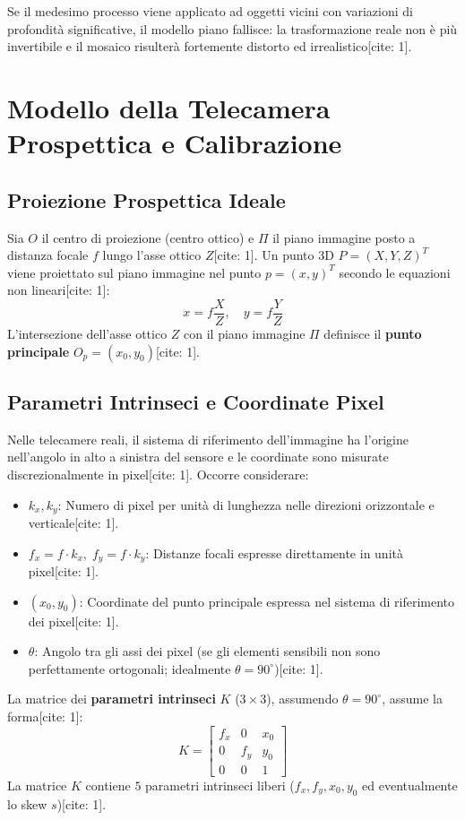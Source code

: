 Se il medesimo processo viene applicato ad oggetti vicini con variazioni di profondità significative, il modello piano fallisce: la trasformazione reale non è più invertibile e il mosaico risulterà fortemente distorto ed irrealistico[cite: 1].

\section{Modello della Telecamera Prospettica e Calibrazione}

\subsection{Proiezione Prospettica Ideale}
Sia $O$ il centro di proiezione (centro ottico) e $\Pi$ il piano immagine posto a distanza focale $f$ lungo l'asse ottico $Z$[cite: 1]. Un punto 3D $P = (X, Y, Z)^T$ viene proiettato sul piano immagine nel punto $p = (x, y)^T$ secondo le equazioni non lineari[cite: 1]:
\begin{equation}
x = f \frac{X}{Z}, \quad y = f \frac{Y}{Z}
\end{equation}
L'intersezione dell'asse ottico $Z$ con il piano immagine $\Pi$ definisce il \textbf{punto principale} $O_p = (x_0, y_0)$[cite: 1].

\subsection{Parametri Intrinseci e Coordinate Pixel}
Nelle telecamere reali, il sistema di riferimento dell'immagine ha l'origine nell'angolo in alto a sinistra del sensore e le coordinate sono misurate discrezionalmente in pixel[cite: 1]. Occorre considerare:
\begin{itemize}
    \item $k_x, k_y$: Numero di pixel per unità di lunghezza nelle direzioni orizzontale e verticale[cite: 1].
    \item $f_x = f \cdot k_x, \; f_y = f \cdot k_y$: Distanze focali espresse direttamente in unità pixel[cite: 1].
    \item $(x_0, y_0)$: Coordinate del punto principale espressa nel sistema di riferimento dei pixel[cite: 1].
    \item $\theta$: Angolo tra gli assi dei pixel (se gli elementi sensibili non sono perfettamente ortogonali; idealmente $\theta = 90^\circ$)[cite: 1].
\end{itemize}

La matrice dei \textbf{parametri intrinseci} $K$ ($3 \times 3$), assumendo $\theta = 90^\circ$, assume la forma[cite: 1]:
\begin{equation}
K = \begin{bmatrix} f_x & 0 & x_0 \\ 0 & f_y & y_0 \\ 0 & 0 & 1 \end{bmatrix}
\end{equation}
La matrice $K$ contiene $5$ parametri intrinseci liberi ($f_x, f_y, x_0, y_0$ ed eventualmente lo skew $s$)[cite: 1].

